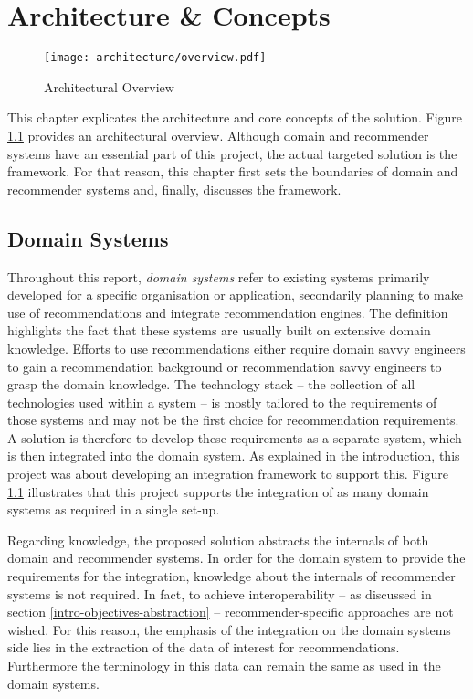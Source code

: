 \chapter{Architecture \& Concepts}

\begin{figure}[ht]
    \texttt{[image: architecture/overview.pdf]}
    \caption{Architectural Overview}
    \label{fig:architecture}
\end{figure}

This chapter explicates the architecture and core concepts of the solution. Figure \ref{fig:architecture} provides an architectural overview. Although domain and recommender systems have an essential part of this project, the actual targeted solution is the framework. For that reason, this chapter first sets the boundaries of domain and recommender systems and, finally, discusses the framework.

\section{Domain Systems}
\label{architecture-domain-systems}

Throughout this report, \emph{domain systems} refer to existing systems primarily developed for a specific organisation or application, secondarily planning to make use of recommendations and integrate recommendation engines. The definition highlights the fact that these systems are usually built on extensive domain knowledge. Efforts to use recommendations either require domain savvy engineers to gain a recommendation background or recommendation savvy engineers to grasp the domain knowledge. The technology stack -- the collection of all technologies used within a system -- is mostly tailored to the requirements of those systems and may not be the first choice for recommendation requirements. A solution is therefore to develop these requirements as a separate system, which is then integrated into the domain system. As explained in the introduction, this project was about developing an integration framework to support this. Figure \ref{fig:architecture} illustrates that this project supports the integration of as many domain systems as required in a single set-up.

Regarding knowledge, the proposed solution abstracts the internals of both domain and recommender systems. In order for the domain system to provide the requirements for the integration, knowledge about the internals of recommender systems is not required. In fact, to achieve interoperability -- as discussed in section \ref{intro-objectives-abstraction} -- recommender-specific approaches are not wished. For this reason, the emphasis of the integration on the domain systems side lies in the extraction of the data of interest for recommendations. Furthermore the terminology in this data can remain the same as used in the domain systems.


